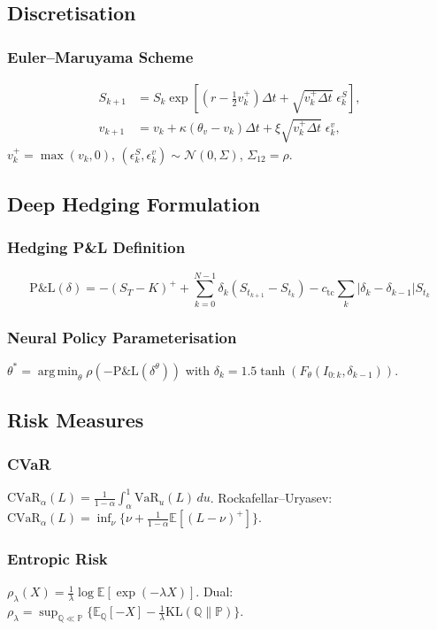 \documentclass[11pt]{article}
\newcommand{\E}{\mathbb{E}}
\newcommand{\PP}{\mathbb{P}}
\newcommand{\QQ}{\mathbb{Q}}
\newcommand{\cvar}{\mathrm{CVaR}}
\newcommand{\VaR}{\mathrm{VaR}}
\DeclareMathOperator*{\argmin}{arg\,min}
\begin{document}
\subsection{Discretisation}
\subsubsection{Euler--Maruyama Scheme}
\begin{align}
S_{k+1} &= S_k \exp[(r - \tfrac{1}{2}v_k^+)\Delta t + \sqrt{v_k^+\Delta t}\;\epsilon_k^S],\\
v_{k+1} &= v_k + \kappa(\theta_v - v_k)\Delta t + \xi\sqrt{v_k^+\Delta t}\;\epsilon_k^v,
\end{align}
$v_k^+ = \max(v_k, 0)$, $(\epsilon_k^S, \epsilon_k^v) \sim \mathcal{N}(0, \Sigma)$, $\Sigma_{12} = \rho$.

\subsection{Deep Hedging Formulation}
\subsubsection{Hedging P\&L Definition}
\begin{equation}
\mathrm{P\&L}(\delta) = -(S_T{-}K)^+ + \sum_{k=0}^{N-1} \delta_k (S_{t_{k+1}} {-} S_{t_k}) - c_{\mathrm{tc}} \sum_{k} |\delta_k {-} \delta_{k-1}| S_{t_k}
\end{equation}

\subsubsection{Neural Policy Parameterisation}
$\theta^* = \argmin_\theta \rho(-\mathrm{P\&L}(\delta^\theta))$ with $\delta_k = 1.5\tanh(F_\theta(I_{0:k}, \delta_{k-1}))$.

\subsection{Risk Measures}
\subsubsection{CVaR}
$\cvar_\alpha(L) = \frac{1}{1-\alpha}\int_\alpha^1 \VaR_u(L)\,du$. Rockafellar--Uryasev: $\cvar_\alpha(L) = \inf_\nu\{\nu + \frac{1}{1-\alpha}\E[(L-\nu)^+]\}$.

\subsubsection{Entropic Risk}
$\rho_\lambda(X) = \frac{1}{\lambda}\log\E[\exp(-\lambda X)]$. Dual: $\rho_\lambda = \sup_{\QQ \ll \PP}\{\E_\QQ[-X] - \frac{1}{\lambda}\mathrm{KL}(\QQ\|\PP)\}$.
\end{document}

